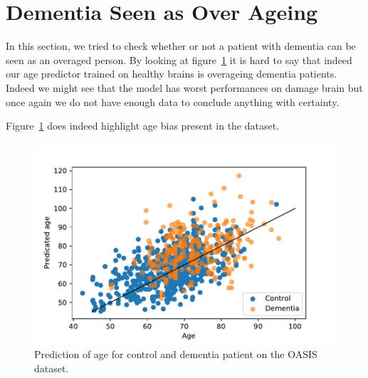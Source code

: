 \section{Dementia Seen as Over Ageing}
In this section, we tried to check whether or not a patient with dementia can be seen as an overaged person. By looking at figure~\ref{fig:dem_vs_control_age_pred} it is hard to say that indeed our age predictor trained on healthy brains is overageing dementia patients. Indeed we might see that the model has worst performances on damage brain but once again we do not have enough data to conclude anything with certainty. 

Figure~\ref{fig:dem_vs_control_age_pred} does indeed highlight age bias present in the dataset. 
\begin{figure}
 \centering
 \includegraphics[width=.9\linewidth]{figures/Experiements/dem_vs_cont_age_pred.pdf}
 \captionsetup{width=.9\linewidth}
 \caption{Prediction of age for control and dementia patient on the OASIS dataset.}
 \label{fig:dem_vs_control_age_pred}
\end{figure}
